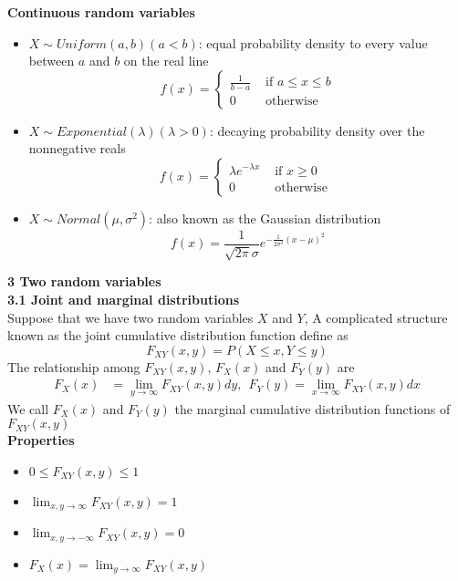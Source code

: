 \documentclass[10pt,a4paper,oneside]{beamer}
\begin{document}
\begin{frame}
\vspace{0.5cm}
{\bfseries Continuous random variables} 
\vspace{0.2cm}
\begin{itemize}
	\item $X\sim Uniform(a,b)(a<b)$: equal probability density to every value between $a$ and $b$ on the real line
	\[
	f(x)=\left\{\begin{array}{ll}{\frac{1}{b-a}} & {\text { if } a \leq x \leq b}\\{0} & {\text { otherwise }}\end{array}\right.
	\]
	\item $X\sim Exponential(\lambda)(\lambda>0)$: decaying probability density over the nonnegative reals
	\[
	f(x)=\left\{\begin{array}{ll}{\lambda e^{-\lambda x}} & {\text { if } x \geq 0}\\{0} & {\text { otherwise }}\end{array}\right.
	\]
	\item $X\sim Normal(\mu,\sigma^2)$: also known as the Gaussian distribution
	\[
	f(x)=\frac{1}{\sqrt{2 \pi} \sigma} e^{-\frac{1}{2 \sigma^{2}}(x-\mu)^{2}}
	\]
\end{itemize}
\end{frame}
\begin{frame}
\vspace{0.1cm}
{\bfseries 3 Two random variables} 
\vspace{0.2cm}
\\{\bfseries 3.1 Joint and marginal distributions} 
\vspace{0.2cm}
\\Suppose that we have two random variables $X$ and $Y$, A complicated structure known as the joint cumulative distribution function  define as
\[
F_{XY}(x,y)=P(X\leqslant x,Y\leqslant y)
\]
The relationship among $F_{XY}(x,y)$, $F_X(x)$ and $F_Y(y)$ are
\[
\begin{aligned} F_{X}(x) &=\lim _{y \rightarrow \infty} F_{X Y}(x, y) d y ,\ \   F_{Y}(y) =\lim _{x \rightarrow \infty} F_{X Y}(x, y) d x \end{aligned}
\]
We call $F_X(x)$ and $F_Y(y)$ the marginal cumulative distribution functions of $F_{XY}(x,y)$
\vspace{0.2cm}
\\{\bfseries Properties}
\begin{itemize}
	\item $0 \leqslant F_{X Y}(x, y) \leqslant 1$
	\item $\lim _{x, y \rightarrow \infty} F_{X Y}(x, y)=1$
	\item $\lim _{x, y \rightarrow-\infty} F_{X Y}(x, y)=0$
	\item $F_{X}(x)=\lim _{y \rightarrow \infty} F_{X Y}(x, y) $
\end{itemize} 
\end{frame}
\end{document}
